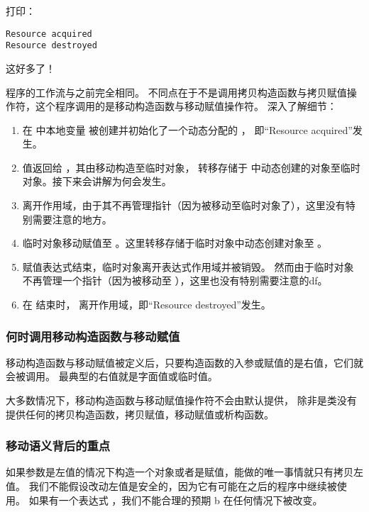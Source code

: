 \documentclass[../../LearnCpp.tex]{subfiles}
\begin{document}
打印：

\begin{lstlisting}
Resource acquired
Resource destroyed
\end{lstlisting}

这好多了！

程序的工作流与之前完全相同。
不同点在于不是调用拷贝构造函数与拷贝赋值操作符，这个程序调用的是移动构造函数与移动赋值操作符。
深入了解细节：

\begin{enumerate}
  \item 在  中本地变量  被创建并初始化了一个动态分配的 ，
        即“Resource acquired”发生。
  \item {} 值返回给 ，其由移动构造至临时对象，
        转移存储于  中动态创建的对象至临时对象。接下来会讲解为何会发生。
  \item {} 离开作用域，由于其不再管理指针（因为被移动至临时对象了），这里没有特别需要注意的地方。
  \item 临时对象移动赋值至 。这里转移存储于临时对象中动态创建对象至 。
  \item 赋值表达式结束，临时对象离开表达式作用域并被销毁。
        然而由于临时对象不再管理一个指针（因为被移动至 ），这里也没有特别需要注意的df。
  \item 在  结束时， 离开作用域，即“Resource destroyed”发生。
\end{enumerate}

\subsubsection*{何时调用移动构造函数与移动赋值}

移动构造函数与移动赋值被定义后，只要构造函数的入参或赋值的是右值，它们就会被调用。
最典型的右值就是字面值或临时值。

大多数情况下，移动构造函数与移动赋值操作符不会由默认提供，
除非是类没有提供任何的拷贝构造函数，拷贝赋值，移动赋值或析构函数。

\subsubsection*{移动语义背后的重点}

如果参数是左值的情况下构造一个对象或者是赋值，能做的唯一事情就只有拷贝左值。
我们不能假设改动左值是安全的，因为它有可能在之后的程序中继续被使用。
如果有一个表达式 ，我们不能合理的预期 b 在任何情况下被改变。
\end{document}
